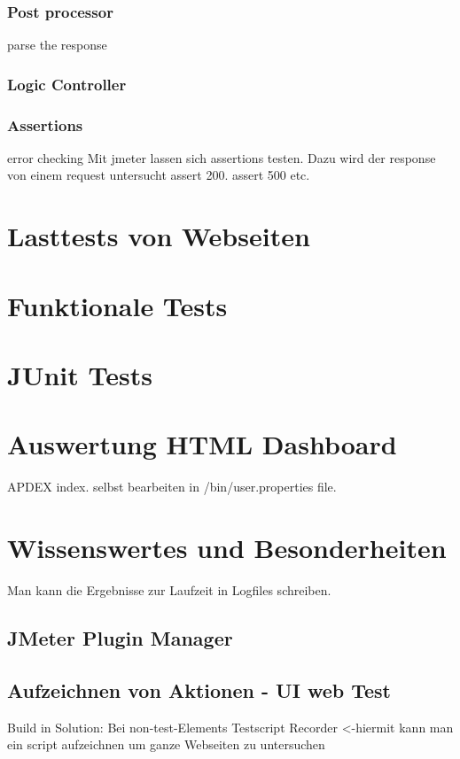 \documentclass[a4paper,12pt]{article}
\begin{document}
\subsubsection{Post processor}
parse the response
\subsubsection{Logic Controller}

\subsubsection{Assertions}
error checking
Mit jmeter lassen sich assertions testen. Dazu wird der response von einem request untersucht assert 200. assert 500 etc.

\section{Lasttests von Webseiten}

\section{Funktionale Tests}

\section{JUnit Tests}
\label{chap:junit_tests}

\section{Auswertung HTML Dashboard}
\label{chap:html_dashboard}
APDEX index. selbst bearbeiten in /bin/user.properties file.

\section{Wissenswertes und Besonderheiten}
\label{sec:wissenswertes}
Man kann die Ergebnisse zur Laufzeit in Logfiles schreiben.

\subsection{JMeter Plugin Manager}



\subsection{Aufzeichnen von Aktionen - UI web Test}
Build in Solution:
Bei non-test-Elements Testscript Recorder <-hiermit kann man ein script aufzeichnen um ganze Webseiten zu untersuchen
\end{document}
